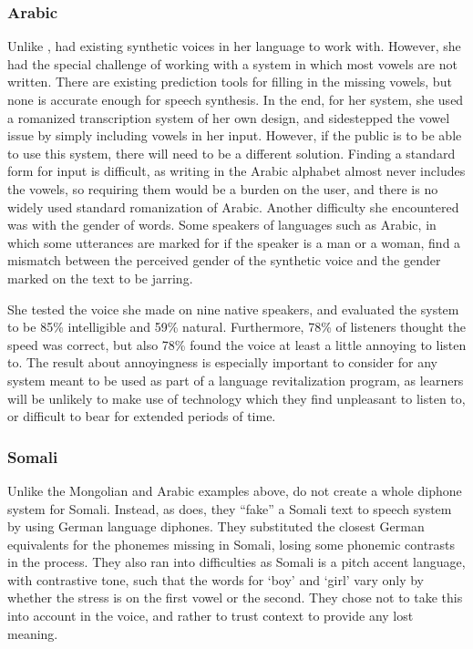 \documentclass[12pt]{article}
\begin{document}
		\subsubsection{Arabic}
		Unlike \citet{mongolian}, \citet{Arabic-Festival} had existing synthetic voices in her language to work with. However, she had the special challenge of working with a system in which most vowels are not written. There are existing prediction tools for filling in the missing vowels, but none is accurate enough for speech synthesis. In the end, for her system, she used a romanized transcription system of her own design, and sidestepped the vowel issue by simply including vowels in her input. However, if the public is to be able to use this system, there will need to be a different solution. Finding a standard form for input is difficult, as writing in the Arabic alphabet almost never includes the vowels, so requiring them would be a burden on the user, and there is no widely used standard romanization of Arabic. Another difficulty she encountered was with the gender of words. Some speakers of languages such as Arabic, in which some utterances are marked for if the speaker is a man or a woman, find a mismatch between the perceived gender of the synthetic voice and the gender marked on the text to be jarring.
		\par

		She tested the voice she made on nine native speakers, and evaluated the system to be 85\% intelligible and 59\% natural. Furthermore, 78\% of listeners thought the speed was correct, but also 78\% found the voice at least a little annoying to listen to. The result about annoyingness is especially important to consider for any system meant to be used as part of a language revitalization program, as learners will be unlikely to make use of technology which they find unpleasant to listen to, or difficult to bear for extended periods of time. \par

		\subsubsection{Somali}

		Unlike the Mongolian and Arabic examples above, \citet{faking} do not create a whole diphone system for Somali. Instead, as \citet{de_speech} does, they ``fake'' a Somali text to speech system by using German language diphones. They substituted the closest German equivalents for the phonemes missing in Somali, losing some phonemic contrasts in the process. They also ran into difficulties as Somali is a pitch accent language, with contrastive tone, such that the words for `boy' and `girl' vary only by whether the stress is on the first vowel or the second. They chose not to take this into account in the voice, and rather to trust context to provide any lost meaning. \par
\end{document}
